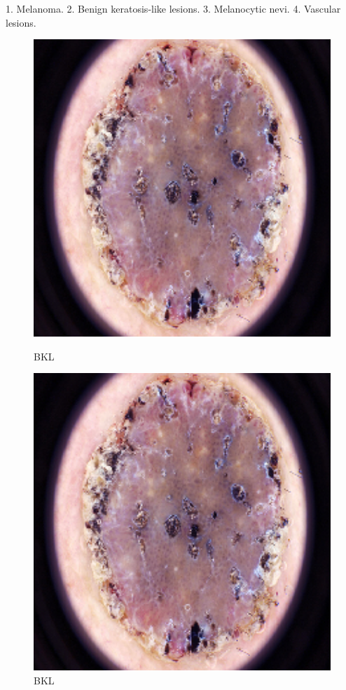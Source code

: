 1. Melanoma. 
2. Benign keratosis-like lesions.
3. Melanocytic nevi. 
4. Vascular lesions.

\begin{figure}[t]
   \centering
   \begin{minipage}[b] {0.32\textwidth}
       \includegraphics[width=1\textwidth]{Images/bkl.png}
       \caption{BKL}
   \end{minipage} %

   \begin{minipage}[b] {0.32\textwidth}
        \includegraphics[width=1\textwidth]{Images/bkl.png}
        \caption{BKL}
    \end{minipage} %


\end{figure}
